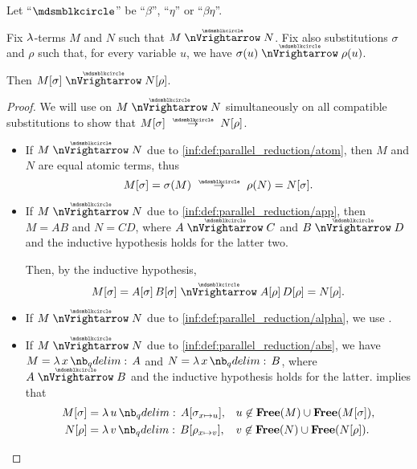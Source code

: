 \begin{proposition}\label{thm:substitution_on_parallel_reduction}
  Let \enquote{\( {\Anon} \)} be \enquote{\( \beta \)}, \enquote{\( \eta \)} or \enquote{\( \beta\eta \)}.

  Fix \( \mathrm{\lambda} \)-terms \( M \) and \( N \) such that \( M \ppred N \). Fix also substitutions \( \sigma \) and \( \rho \) such that, for every variable \( u \), we have \( \sigma(u) \ppred \rho(u) \).

  Then \( M[\sigma] \ppred N[\rho] \).
\end{proposition}
\begin{proof}
  We will use  on \( M \ppred N \) simultaneously on all compatible substitutions to show that \( M[\sigma] \pred N[\rho] \).
  \begin{itemize}
    \item If \( M \ppred N \) due to \ref{inf:def:parallel_reduction/atom}, then \( M \) and \( N \) are equal atomic terms, thus
    \begin{equation*}
      M[\sigma] = \sigma(M) \pred \rho(N) = N[\sigma].
    \end{equation*}

    \item If \( M \ppred N \) due to \ref{inf:def:parallel_reduction/app}, then \( M = AB \) and \( N = CD \), where \( A \ppred C \) and \( B \ppred D \) and the inductive hypothesis holds for the latter two.

    Then, by the inductive hypothesis,
    \begin{equation*}
      M[\sigma]
      =
      A[\sigma] \thinspace B[\sigma]
      \ppred
      A[\rho] \thinspace D[\rho]
      =
      N[\rho].
    \end{equation*}

    \item If \( M \ppred N \) due to \ref{inf:def:parallel_reduction/alpha}, we use .

    \item If \( M \ppred N \) due to \ref{inf:def:parallel_reduction/abs}, we have \( M = \qabs x A \) and \( N = \qabs x B \), where \( A \ppred B \) and the inductive hypothesis holds for the latter.  implies that
    \begin{align*}
      M[\sigma] &= \qabs u A[\sigma_{x \mapsto u}], &&u \not\in \op*{Free}(M) \cup \op*{Free}(M[\sigma]), \\
      N[\rho]   &= \qabs v B[\rho_{x \mapsto v}],   &&v \not\in \op*{Free}(N) \cup \op*{Free}(N[\rho]).
    \end{align*}


\end{itemize}
\end{proof}
